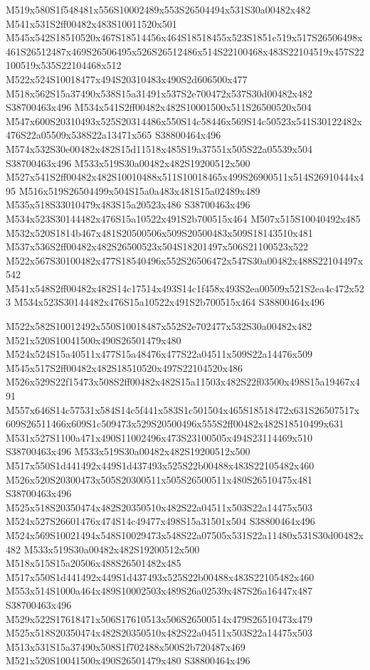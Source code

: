 \documentclass{article}
\begin{document}
\begin{multicols}{2}
M519x580S1f548481x556S10002489x553S26504494x531S30a00482x482 M541x531S2ff00482x483S10011520x501 M545x542S18510520x467S18514456x464S18518455x523S1851c519x517S26506498x461S26512487x469S26506495x526S26512486x514S22100468x483S22104519x457S22100519x535S22104468x512 M522x524S10018477x494S20310483x490S2d606500x477 M518x562S15a37490x538S15a31491x537S2e700472x537S30d00482x482 S38700463x496 M534x541S2ff00482x482S10001500x511S26500520x504 M547x600S20310493x525S20314486x550S14c58446x569S14c50523x541S30122482x476S22a05509x538S22a13471x565 S38800464x496 M574x532S30e00482x482S15d11518x485S19a37551x505S22a05539x504 S38700463x496 M533x519S30a00482x482S19200512x500 M527x541S2ff00482x482S10010488x511S10018465x499S26900511x514S26910444x495 M516x519S26504499x504S15a0a483x481S15a02489x489 M535x518S33010479x483S15a20523x486 S38700463x496 M534x523S30144482x476S15a10522x491S2b700515x464 M507x515S10040492x485 M532x520S1814b467x481S20500506x509S20500483x509S18143510x481 M537x536S2ff00482x482S26500523x504S18201497x506S21100523x522 M522x567S30100482x477S18540496x552S26506472x547S30a00482x488S22104497x542 M541x548S2ff00482x482S14c17514x493S14c1f458x493S2ea00509x521S2ea4c472x523 M534x523S30144482x476S15a10522x491S2b700515x464 S38800464x496

M522x582S10012492x550S10018487x552S2e702477x532S30a00482x482 M521x520S10041500x490S26501479x480 M524x524S15a40511x477S15a48476x477S22a04511x509S22a14476x509 M545x517S2ff00482x482S18510520x497S22104520x486 M526x529S22f15473x508S2ff00482x482S15a11503x482S22f03500x498S15a19467x491 M557x646S14c57531x584S14c5f441x583S1c501504x465S18518472x631S26507517x609S26511466x609S1c509473x529S20500496x555S2ff00482x482S18510499x631 M531x527S1100a471x490S11002496x473S23100505x494S23114469x510 S38700463x496 M533x519S30a00482x482S19200512x500 M517x550S1d441492x449S1d437493x525S22b00488x483S22105482x460 M526x520S20300473x505S20300511x505S26500511x480S26510475x481 S38700463x496 M525x518S20350474x482S20350510x482S22a04511x503S22a14475x503 M524x527S26601476x474S14c49477x498S15a31501x504 S38800464x496 M524x569S10021494x548S10029473x548S22a07505x531S22a11480x531S30d00482x482 M533x519S30a00482x482S19200512x500 M518x515S15a20506x488S26501482x485 M517x550S1d441492x449S1d437493x525S22b00488x483S22105482x460 M553x514S1000a464x489S10002503x489S26a02539x487S26a16447x487 S38700463x496 M529x522S17618471x506S17610513x506S26500514x479S26510473x479 M525x518S20350474x482S20350510x482S22a04511x503S22a14475x503 M513x531S15a37490x508S1f702488x500S2b720487x469 M521x520S10041500x490S26501479x480 S38800464x496


\end{multicols}
\end{document}
